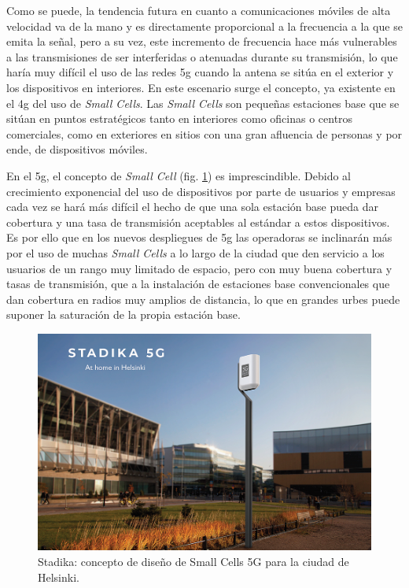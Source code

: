 \par Como se puede, la tendencia futura en cuanto a comunicaciones móviles de alta velocidad va de la mano y es directamente proporcional a la frecuencia a la que se emita la señal, pero a su vez, este incremento de frecuencia hace más vulnerables a las transmisiones de ser interferidas o atenuadas durante su transmisión, lo que haría muy difícil el uso de las redes \gls{5g} cuando la antena se sitúa en el exterior y los dispositivos en interiores. En este escenario surge el concepto, ya existente en el \gls{4g} del uso de \textit{Small Cells}. Las \textit{Small Cells} son pequeñas estaciones base que se sitúan en puntos estratégicos tanto en interiores como oficinas o centros comerciales, como en exteriores en sitios con una gran afluencia de personas y por ende, de dispositivos móviles. 
\\
\par En el \gls{5g}, el concepto de \textit{Small Cell} (fig. \ref{fig:stadika}) es imprescindible. Debido al crecimiento exponencial del uso de dispositivos por parte de usuarios y empresas cada vez se hará más difícil el hecho de que una sola estación base pueda dar cobertura y una tasa de transmisión aceptables al estándar a estos dispositivos. Es por ello que en los nuevos despliegues de \gls{5g} las operadoras se inclinarán más por el uso de muchas \textit{Small Cells} a lo largo de la ciudad que den servicio a los usuarios de un rango muy limitado de espacio, pero con muy buena cobertura y tasas de transmisión, que a la instalación de estaciones base convencionales que dan cobertura en radios muy amplios de distancia, lo que en grandes urbes puede suponer la saturación de la propia estación base.
\\
\begin{figure}[h]
    \centering
        \includegraphics[width=\textwidth]{archivos/stadika}
        \caption{Stadika: concepto de diseño de Small Cells 5G para la ciudad de Helsinki. \cite{Muesa2019}}
        \label{fig:stadika}
\end{figure}

